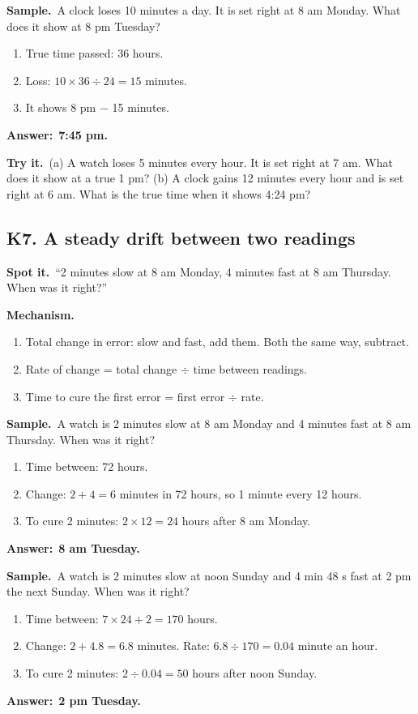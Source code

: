 \documentclass[11pt,a4paper]{article}
\let\oldsubsection\subsection
\renewcommand{\subsection}{\needspace{9\baselineskip}\oldsubsection}
\newcommand{\spot}{\textbf{\color{ember}Spot it.}\ }
\newcommand{\mech}{\textbf{\color{ember}Mechanism.}\ }
\newif\ifkeepsamp
\newcommand{\ans}[1]{\par\nopagebreak\noindent\textbf{\color{ember}Answer:}\ \textbf{#1}\par}
\newcommand{\samp}{\ifkeepsamp\needspace{4\baselineskip}\fi\textbf{\color{ember}Sample.}\ }
\newcommand{\tryit}[1]{\textbf{\color{ember}Try it.}\ #1}
\begin{document}
\samp A clock loses 10 minutes a day. It is set right at 8 am Monday. What does it show at 8 pm Tuesday?
\begin{enumerate}
\item True time passed: 36 hours.
\item Loss: $10 \times 36 \div 24 = 15$ minutes.
\item It shows 8 pm $-$ 15 minutes.
\end{enumerate}
\ans{7:45 pm.}

\tryit (a) A watch loses 5 minutes every hour. It is set right at 7 am. What does it show at a true 1 pm? (b) A clock gains 12 minutes every hour and is set right at 6 am. What is the true time when it shows 4:24 pm?

\subsection{K7. A steady drift between two readings}
\spot ``2 minutes slow at 8 am Monday, 4 minutes fast at 8 am Thursday. When was it right?''

\mech
\begin{enumerate}
\item Total change in error: slow and fast, add them. Both the same way, subtract.
\item Rate of change = total change $\div$ time between readings.
\item Time to cure the first error = first error $\div$ rate.
\end{enumerate}

\samp A watch is 2 minutes slow at 8 am Monday and 4 minutes fast at 8 am Thursday. When was it right?
\begin{enumerate}
\item Time between: 72 hours.
\item Change: $2 + 4 = 6$ minutes in 72 hours, so 1 minute every 12 hours.
\item To cure 2 minutes: $2 \times 12 = 24$ hours after 8 am Monday.
\end{enumerate}
\ans{8 am Tuesday.}

\samp A watch is 2 minutes slow at noon Sunday and 4 min 48 s fast at 2 pm the next Sunday. When was it right?
\begin{enumerate}
\item Time between: $7 \times 24 + 2 = 170$ hours.
\item Change: $2 + 4.8 = 6.8$ minutes. Rate: $6.8 \div 170 = 0.04$ minute an hour.
\item To cure 2 minutes: $2 \div 0.04 = 50$ hours after noon Sunday.
\end{enumerate}
\ans{2 pm Tuesday.}
\end{document}
